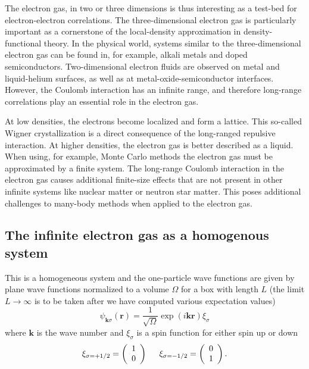 \documentclass[%
oneside,                 %
final,                   %
10pt]{article}
\begin{document}
The electron gas, in 
two or three dimensions is thus interesting as a test-bed for 
electron-electron correlations. The three-dimensional 
electron gas is particularly important as a cornerstone 
of the local-density approximation in density-functional 
theory. In the physical world, systems 
similar to the three-dimensional electron gas can be 
found in, for example, alkali metals and doped 
semiconductors. Two-dimensional electron fluids are 
observed on metal and liquid-helium surfaces, as well as 
at metal-oxide-semiconductor interfaces. However, the Coulomb 
interaction has an infinite range, and therefore 
long-range correlations play an essential role in the
electron gas. 




At low densities, the electrons become 
localized and form a lattice. This so-called Wigner 
crystallization is a direct consequence 
of the long-ranged repulsive interaction. At higher
densities, the electron gas is better described as a
liquid.
When using, for example, Monte Carlo methods the electron gas must be approximated 
by a finite system. The long-range Coulomb interaction 
in the electron gas causes additional finite-size effects  that are not
present in other infinite systems like nuclear matter or neutron star matter.
This poses additional challenges to many-body methods when applied 
to the electron gas.





\subsection*{The infinite electron gas as a homogenous system}

This is a homogeneous system and the one-particle wave functions are given by plane wave functions normalized to a volume $\Omega$ 
for a box with length $L$ (the limit $L\rightarrow \infty$ is to be taken after we have computed various expectation values)
\[
\psi_{\mathbf{k}\sigma}(\mathbf{r})= \frac{1}{\sqrt{\Omega}}\exp{(i\mathbf{kr})}\xi_{\sigma}
\]
where $\mathbf{k}$ is the wave number and  $\xi_{\sigma}$ is a spin function for either spin up or down
\[ 
\xi_{\sigma=+1/2}=\left(\begin{array}{c} 1 \\ 0 \end{array}\right) \hspace{0.5cm}
\xi_{\sigma=-1/2}=\left(\begin{array}{c} 0 \\ 1 \end{array}\right).
\]
\end{document}
